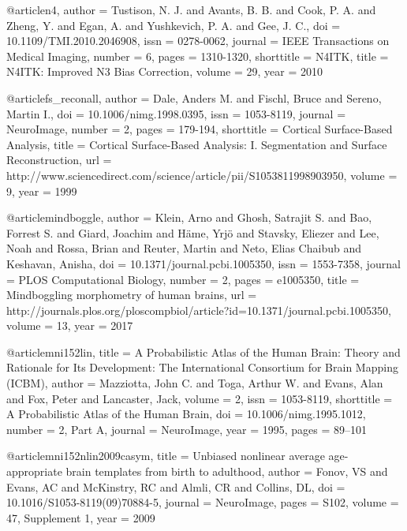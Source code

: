 @article{n4,
    author = {Tustison, N. J. and Avants, B. B. and Cook, P. A. and Zheng, Y. and Egan, A. and Yushkevich, P. A. and Gee, J. C.},
    doi = {10.1109/TMI.2010.2046908},
    issn = {0278-0062},
    journal = {IEEE Transactions on Medical Imaging},
    number = 6,
    pages = {1310-1320},
    shorttitle = {N4ITK},
    title = {N4ITK: Improved N3 Bias Correction},
    volume = 29,
    year = 2010
}

@article{fs_reconall,
    author = {Dale, Anders M. and Fischl, Bruce and Sereno, Martin I.},
    doi = {10.1006/nimg.1998.0395},
    issn = {1053-8119},
    journal = {NeuroImage},
    number = 2,
    pages = {179-194},
    shorttitle = {Cortical Surface-Based Analysis},
    title = {Cortical Surface-Based Analysis: I. Segmentation and Surface Reconstruction},
    url = {http://www.sciencedirect.com/science/article/pii/S1053811998903950},
    volume = 9,
    year = 1999
}



@article{mindboggle,
    author = {Klein, Arno and Ghosh, Satrajit S. and Bao, Forrest S. and Giard, Joachim and Häme, Yrjö and Stavsky, Eliezer and Lee, Noah and Rossa, Brian and Reuter, Martin and Neto, Elias Chaibub and Keshavan, Anisha},
    doi = {10.1371/journal.pcbi.1005350},
    issn = {1553-7358},
    journal = {PLOS Computational Biology},
    number = 2,
    pages = {e1005350},
    title = {Mindboggling morphometry of human brains},
    url = {http://journals.plos.org/ploscompbiol/article?id=10.1371/journal.pcbi.1005350},
    volume = 13,
    year = 2017
}

@article{mni152lin,
    title = {A {Probabilistic} {Atlas} of the {Human} {Brain}: {Theory} and {Rationale} for {Its} {Development}: {The} {International} {Consortium} for {Brain} {Mapping} ({ICBM})},
    author = {Mazziotta, John C. and Toga, Arthur W. and Evans, Alan and Fox, Peter and Lancaster, Jack},
    volume = {2},
    issn = {1053-8119},
    shorttitle = {A {Probabilistic} {Atlas} of the {Human} {Brain}},
    doi = {10.1006/nimg.1995.1012},
    number = {2, Part A},
    journal = {NeuroImage},
    year = {1995},
    pages = {89--101}
}

@article{mni152nlin2009casym,
    title = {Unbiased nonlinear average age-appropriate brain templates from birth to adulthood},
    author = {Fonov, VS and Evans, AC and McKinstry, RC and Almli, CR and Collins, DL},
    doi = {10.1016/S1053-8119(09)70884-5},
    journal = {NeuroImage},
    pages = {S102},
    volume = {47, Supplement 1},
    year = 2009
}

